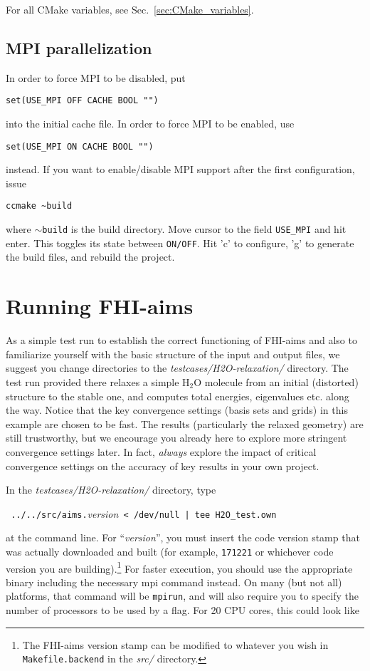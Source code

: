 For all CMake variables, see Sec.~\ref{sec:CMake_variables}.

\subsection{MPI parallelization}

In order to force MPI to be disabled, put
\begin{verbatim}
set(USE_MPI OFF CACHE BOOL "")
\end{verbatim}
into the initial cache file. In order to force MPI to be enabled, use
\begin{verbatim}
set(USE_MPI ON CACHE BOOL "")
\end{verbatim}
instead. If you want to enable/disable MPI support after the first configuration, issue
\begin{verbatim}
ccmake ~build
\end{verbatim}
where $\sim$\texttt{build} is the build directory. Move cursor to the field \verb+USE_MPI+ and hit enter. This toggles its state between \texttt{ON/OFF}. Hit 'c' to configure, 'g' to generate the build files, and rebuild the project.

\section{Running FHI-aims}
\label{Sec:running}

As a simple test run to establish the correct functioning of FHI-aims and also
to familiarize yourself with the basic structure of the input and output
files, we suggest you change directories to the
\emph{testcases/H2O-relaxation/} directory. The test run provided there relaxes
a simple H$_2$O molecule from an initial (distorted) structure to the stable
one, and computes total energies, eigenvalues etc. along the way. Notice that
the key convergence settings (basis sets and grids) in this example are chosen
to be fast. The results (particularly the relaxed geometry) are still
trustworthy, but we encourage you already here to explore more
stringent convergence settings later. In fact, \emph{always} explore the
impact of critical convergence settings on the accuracy of key results in your
own project.

In the \emph{testcases/H2O-relaxation/} directory, type

{
  \verb+ ../../src/aims.+\emph{version}\verb+ < /dev/null | tee H2O_test.own+
}

at the command line. For ``\emph{version}'', you must insert the code version stamp 
that was actually downloaded and built (for example, \verb+171221+ or
whichever code version you are building).\footnote{The  
FHI-aims version stamp can be modified to whatever you wish in
\texttt{Makefile.backend} in the \emph{src/} directory.} 
For faster execution, you should use the appropriate binary including the necessary mpi command
instead. On many (but not all) platforms, that command will be
\texttt{mpirun}, and will also require you to specify the number of processors
to be used by a flag. For 20
CPU cores, this could look like

